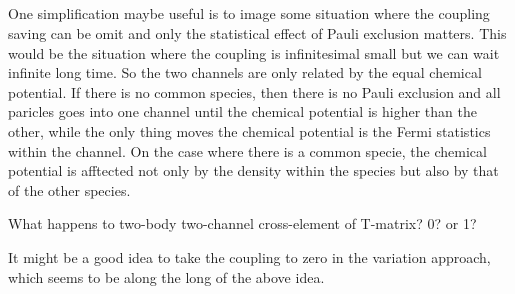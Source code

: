 \subsection{}
One simplification maybe useful is to image some situation where the coupling saving can be omit and only the statistical effect of Pauli exclusion matters.  This would be the situation where the coupling is infinitesimal small but we can wait infinite long time.  So the two channels are only related by the equal chemical potential.  If there is no common species, then there is no Pauli exclusion and all paricles goes into one channel until the chemical potential is higher than the other, while the only thing moves the chemical potential is the Fermi statistics within the channel.  On the case where there is a common specie, the chemical potential is afftected not only by the density within the species but also by that of the other species.

What happens to two-body two-channel cross-element of T-matrix?  0? or 1? 

It might be a good idea to take the coupling to zero in the variation approach, which seems to be along the long of the above idea. 